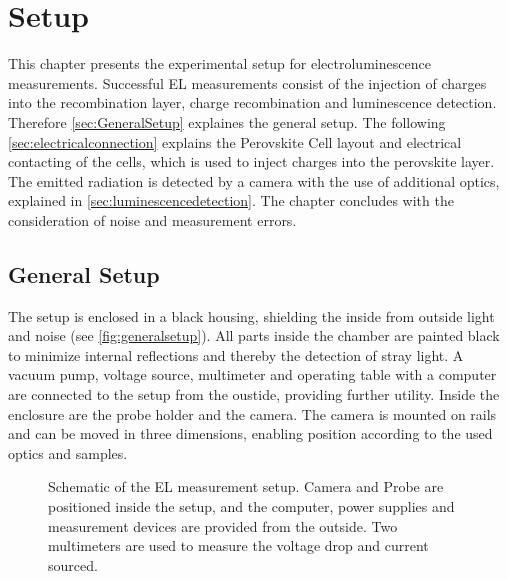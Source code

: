 \chapter{Setup}
This chapter presents the experimental setup for electroluminescence measurements. Successful EL measurements consist of the injection of charges into the recombination layer, charge recombination and luminescence detection. Therefore \autoref{sec:GeneralSetup} explaines the general setup. The following \autoref{sec:electricalconnection} explains the Perovskite Cell layout and electrical contacting of the cells, which is used to inject charges into the perovskite layer. The emitted radiation is detected by a camera with the use of additional optics,  explained in \autoref{sec:luminescencedetection}. The chapter concludes with the consideration of noise and measurement errors.

\section{General Setup}\label{sec:GeneralSetup}
The setup is enclosed in a black housing, shielding the inside from outside light and noise (see \autoref{fig:generalsetup}). All parts inside the chamber are painted black to minimize internal reflections and thereby the detection of stray light. A vacuum pump, voltage source, multimeter and operating table with a computer are connected to the setup from the oustide, providing further utility. Inside the enclosure are the probe holder and the camera. The camera is mounted on rails and can be moved in three dimensions, enabling position according to the used optics and samples.
\begin{figure}[h]
	\centering
	
	\caption{Schematic of the EL measurement setup. Camera and Probe are positioned inside the setup, and the computer, power supplies and measurement devices are provided from the outside. Two multimeters are used to measure the voltage drop and current sourced.}
	\label{fig:generalsetup}
\end{figure}
\FloatBarrier
